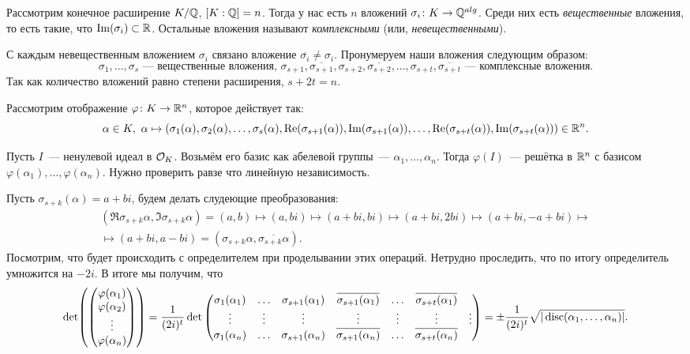	\begin{definition}\hypertarget{real_and_complex_inclusions}{}
		Рассмотрим конечное расширение $K/\mathbb{Q}$, $[K : \mathbb{Q}] = n$. Тогда у нас есть $n$ вложений $\sigma_i \colon K \to \mathbb{Q}^{alg}$. Среди них есть \emph{вещественные} вложения, то есть такие, что $\mathop{\mathrm{Im}}\nolimits(\sigma_i) \subset \mathbb{R}$. Остальные вложения  называют \emph{комплексными} (или, \emph{невещественными}).
	\end{definition}

	 С каждым невещественным вложением $\sigma_i$ связано вложение $\overline{\sigma_i} \neq \sigma_i$. Пронумеруем наши вложения следующим образом:
	  \[
	   \sigma_1, \ldots, \sigma_s \text{~--- вещественные вложения, } \sigma_{s + 1}, \overline{\sigma_{s + 1}}, \sigma_{s + 2}, \overline{\sigma_{s + 2}}, \ldots, \sigma_{s + t}, \overline{\sigma_{s + t}} \text{~--- комплексные вложения.} 
	  \] 
	   Так как количество вложений равно степени расширения, $s + 2t = n$.

	Рассмотрим отображение $\varphi\colon K \to \mathbb{R}^n$, которое действует так:
	\[
		\alpha \in K, \ \alpha \mapsto (\sigma_1(\alpha), \sigma_2(\alpha), \ldots, \sigma_s(\alpha), \mathop{\mathrm{Re}}\nolimits(\sigma_{s + 1}(\alpha)), \mathop{\mathrm{Im}}\nolimits(\sigma_{s + 1}(\alpha)),  \ldots, \mathop{\mathrm{Re}}\nolimits(\sigma_{s + t}(\alpha)), \mathop{\mathrm{Im}}\nolimits(\sigma_{s + t}(\alpha))) \in \mathbb{R}^n.
	\]
	\hypertarget{phi_from_this}{}

	Пусть $I$~--- ненулевой идеал в $\mathcal{O}_{K}$. Возьмём его базис как абелевой группы~--- $\alpha_1, \ldots, \alpha_n$. Тогда $\varphi(I)$~--- решётка в $\mathbb{R}^n$ с базисом $\varphi(\alpha_1), \ldots, \varphi(\alpha_n)$. Нужно проверить равзе что линейную независимость. 

	Пусть $\sigma_{s + k}(\alpha) = a + bi$, будем делать слудеющие преобразования:
	\begin{multline*}
	 	(\Re\sigma_{s+ k}\alpha, \Im\sigma_{s + k}\alpha) = (a, b) \mapsto (a, bi) \mapsto (a + bi, bi) \mapsto (a + bi, 2bi) \mapsto (a + bi, -a + bi) \mapsto \\ \mapsto (a + bi, a - bi) = (\sigma_{s + k}\alpha, \overline{\sigma_{s+k}\alpha}).
	 \end{multline*}
	 Посмотрим, что будет происходить с определителем при проделывании этих операций. Нетрудно проследить, что по итогу определитель умножится на $-2i$. В итоге мы получим, что 
	\[
		\det\lr*{\begin{pmatrix} \varphi(\alpha_1) \\ \varphi(\alpha_2) \\ \vdots \\ \varphi(\alpha_n) \end{pmatrix}} = \frac{1}{(2i)^t} \det{\begin{pmatrix} \sigma_{1}(\alpha_1) & \ldots& \sigma_{s + 1}(\alpha_1) & \overline{\sigma_{s + 1}(\alpha_1)} & \ldots &  \overline{\sigma_{s + t}(\alpha_1)} \\ \vdots & \vdots & \vdots & \vdots & \vdots & \vdots & \vdots \\
		\sigma_{1}(\alpha_n) & \ldots& \sigma_{s + 1}(\alpha_n) & \overline{\sigma_{s + 1}(\alpha_n)} & \ldots &  \overline{\sigma_{s + t}(\alpha_n)} \end{pmatrix}} = \pm \frac{1}{(2i)^t} \sqrt{|\disc(\alpha_1, \ldots, \alpha_n)|}.
	\]

